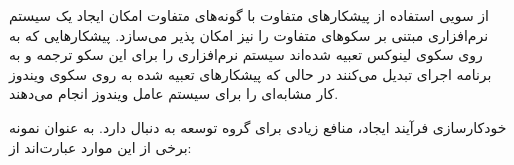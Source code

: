 % 
% 
% 
% 

از سویی استفاده از پیشکارهای متفاوت با گونه‌های متفاوت امکان ایجاد یک سیستم
نرم‌افزاری مبتنی بر سکو‌های متفاوت را نیز امکان پذیر می‌سازد. پیشکارهایی که به
روی سکوی لینوکس تعبیه شده‌اند سیستم نرم‌افزاری را برای این
سکو ترجمه و به برنامه اجرای تبدیل می‌کنند در حالی که پیشکارهای تعبیه شده به روی
سکوی ویندوز کار مشابه‌ای را برای سیستم عامل ویندوز انجام
می‌دهند.


خودکارسازی فرآیند ایجاد، منافع زیادی برای گروه توسعه به دنبال دارد. به عنوان
نمونه برخی از این موارد عبارت‌اند از:

